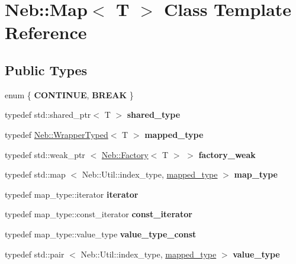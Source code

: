 \hypertarget{classNeb_1_1Map}{\section{\-Neb\-:\-:\-Map$<$ \-T $>$ \-Class \-Template \-Reference}
\label{classNeb_1_1Map}
}
\subsection*{\-Public \-Types}
\begin{DoxyCompactItemize}
\item 
enum \{ {\bfseries \-C\-O\-N\-T\-I\-N\-U\-E}, 
{\bfseries \-B\-R\-E\-A\-K}
 \}
\item 
\hypertarget{classNeb_1_1Map_a6810d118b98686c87dbd11fb46549e10}{typedef std\-::shared\-\_\-ptr$<$ \-T $>$ {\bfseries shared\-\_\-type}}\label{classNeb_1_1Map_a6810d118b98686c87dbd11fb46549e10}

\item 
\hypertarget{classNeb_1_1Map_ac47c5fb9744284a4b6644f7850040095}{typedef \hyperlink{classNeb_1_1WrapperTyped}{\-Neb\-::\-Wrapper\-Typed}$<$ \-T $>$ {\bfseries mapped\-\_\-type}}\label{classNeb_1_1Map_ac47c5fb9744284a4b6644f7850040095}

\item 
\hypertarget{classNeb_1_1Map_a833c7da4ecc80e82f0697466fcb6aa96}{typedef std\-::weak\-\_\-ptr\*
$<$ \hyperlink{classNeb_1_1Factory}{\-Neb\-::\-Factory}$<$ \-T $>$ $>$ {\bfseries factory\-\_\-weak}}\label{classNeb_1_1Map_a833c7da4ecc80e82f0697466fcb6aa96}

\item 
\hypertarget{classNeb_1_1Map_ab36ac72dfa9dbf57548a87870c8ead07}{typedef std\-::map\*
$<$ \-Neb\-::\-Util\-::index\-\_\-type, \*
\hyperlink{classNeb_1_1WrapperTyped}{mapped\-\_\-type} $>$ {\bfseries map\-\_\-type}}\label{classNeb_1_1Map_ab36ac72dfa9dbf57548a87870c8ead07}

\item 
\hypertarget{classNeb_1_1Map_ad2414c63c11316575065264c75670475}{typedef map\-\_\-type\-::iterator {\bfseries iterator}}\label{classNeb_1_1Map_ad2414c63c11316575065264c75670475}

\item 
\hypertarget{classNeb_1_1Map_a988d097aeeeeaf8d9c690ee3972d135a}{typedef map\-\_\-type\-::const\-\_\-iterator {\bfseries const\-\_\-iterator}}\label{classNeb_1_1Map_a988d097aeeeeaf8d9c690ee3972d135a}

\item 
\hypertarget{classNeb_1_1Map_a9beb63846e033e9650dd4d3f2fb1eb2c}{typedef map\-\_\-type\-::value\-\_\-type {\bfseries value\-\_\-type\-\_\-const}}\label{classNeb_1_1Map_a9beb63846e033e9650dd4d3f2fb1eb2c}

\item 
\hypertarget{classNeb_1_1Map_aafec006c2a310eeeaf4eee9de19e948c}{typedef std\-::pair\*
$<$ \-Neb\-::\-Util\-::index\-\_\-type, \*
\hyperlink{classNeb_1_1WrapperTyped}{mapped\-\_\-type} $>$ {\bfseries value\-\_\-type}}\label{classNeb_1_1Map_aafec006c2a310eeeaf4eee9de19e948c}

\end{DoxyCompactItemize}
